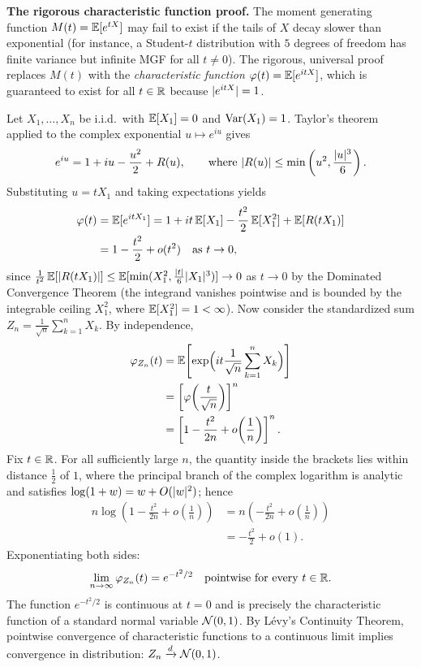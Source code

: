 \begin{formalbox}
\textbf{The rigorous characteristic function proof.}
The moment generating function $M(t) = \operatorname{\mathbb{E}}[e^{tX}]$ may fail to exist if the tails of $X$
decay slower than exponential (for instance, a Student-$t$ distribution with $5$ degrees
of freedom has finite variance but infinite MGF for all $t \ne 0$). The rigorous,
universal proof replaces $M(t)$ with the \emph{characteristic function}
$\varphi(t) = \operatorname{\mathbb{E}}[e^{itX}]$, which is guaranteed to exist for all $t \in \mathbb{R}$ because
$\lvert e^{itX}\rvert = 1$.

Let $X_1, \dots, X_n$ be i.i.d.\ with $\operatorname{\mathbb{E}}[X_1] = 0$ and $\operatorname{Var}(X_1) = 1$. Taylor's
theorem applied to the complex exponential $u \mapsto e^{iu}$ gives
\[
  e^{iu} = 1 + iu - \frac{u^2}{2} + R(u), \qquad \text{where } \lvert R(u)\rvert \le \min\left(u^2, \frac{\lvert u\rvert^3}{6}\right).
\]
Substituting $u = t X_1$ and taking expectations yields
\begin{align*}
  \varphi(t) &= \operatorname{\mathbb{E}}[e^{itX_1}] = 1 + i t \operatorname{\mathbb{E}}[X_1] - \frac{t^2}{2}\operatorname{\mathbb{E}}[X_1^2] + \operatorname{\mathbb{E}}[R(tX_1)] \\
             &= 1 - \frac{t^2}{2} + o(t^2) \quad \text{as } t \to 0,
\end{align*}
since $\frac{1}{t^2}\operatorname{\mathbb{E}}[\lvert R(tX_1)\rvert] \le \operatorname{\mathbb{E}}[\min(X_1^2, \tfrac{|t|}{6}|X_1|^3)] \to 0$ as $t \to 0$ by the Dominated Convergence Theorem (the integrand vanishes pointwise and is bounded by the integrable ceiling $X_1^2$, where $\operatorname{\mathbb{E}}[X_1^2] = 1 < \infty$).
Now consider the standardized sum $Z_n = \frac{1}{\sqrt n} \sum_{k=1}^n X_k$. By independence,
\begin{align*}
  \varphi_{Z_n}(t) &= \operatorname{\mathbb{E}}\!\left[ \exp\!\Big( i t \frac{1}{\sqrt n}\sum_{k=1}^n X_k \Big) \right] \\
                   &= \left[ \varphi\!\left(\frac{t}{\sqrt n}\right) \right]^n \\
                   &= \left[ 1 - \frac{t^2}{2n} + o\!\left(\frac{1}{n}\right) \right]^n.
\end{align*}
Fix $t \in \mathbb{R}$. For all sufficiently large $n$, the quantity inside the brackets lies within
distance $\tfrac12$ of $1$, where the principal branch of the complex logarithm is analytic and
satisfies $\log(1 + w) = w + O(\lvert w\rvert^2)$; hence
\begin{align*}
  n \log\left( 1 - \frac{t^2}{2n} + o\!\left(\frac{1}{n}\right) \right)
  &= n \left( -\frac{t^2}{2n} + o\!\left(\frac{1}{n}\right) \right) \\
  &= -\frac{t^2}{2} + o(1).
\end{align*}
Exponentiating both sides:
\[
  \lim_{n\to\infty} \varphi_{Z_n}(t) = e^{-t^2/2} \quad \text{pointwise for every } t \in \mathbb{R}.
\]
The function $e^{-t^2/2}$ is continuous at $t=0$ and is precisely the characteristic function of
a standard normal variable $\mathcal{N}(0,1)$. By L\'evy's Continuity Theorem, pointwise convergence
of characteristic functions to a continuous limit implies convergence in distribution:
$Z_n \xrightarrow{d} \mathcal{N}(0,1)$.
\end{formalbox}

